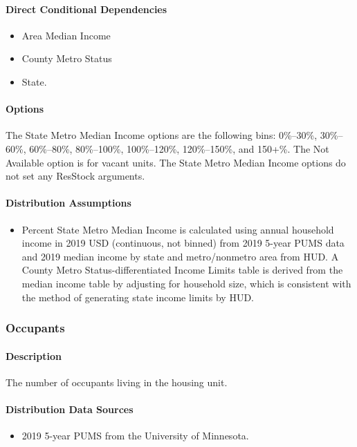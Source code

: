 \paragraph{Direct Conditional Dependencies}
\begin{itemize}
    \item Area Median Income
    \item County Metro Status
    \item State.
\end{itemize}

\paragraph{Options}
The State Metro Median Income options are the following bins: 0\%--30\%, 30\%--60\%, 60\%--80\%, 80\%--100\%, 100\%--120\%, 120\%--150\%, and 150+\%. The Not Available option is for vacant units. The State Metro Median Income options do not set any ResStock arguments.

\paragraph{Distribution Assumptions}
\begin{itemize}
\item
  Percent State Metro Median Income is calculated using annual household
  income in 2019 USD (continuous, not binned) from 2019 5-year PUMS data
  and 2019 median income by state and metro/nonmetro area from HUD. A
  County Metro Status-differentiated Income Limits table is derived from
  the median income table by adjusting for household size, which is consistent with the method of generating state income limits by HUD.
\end{itemize}

\subsubsection{Occupants}\label{occupants}
\paragraph{Description}
The number of occupants living in the housing unit.

\paragraph{Distribution Data Sources}
\begin{itemize}
\item
  2019 5-year PUMS from the University of Minnesota.
\end{itemize}

